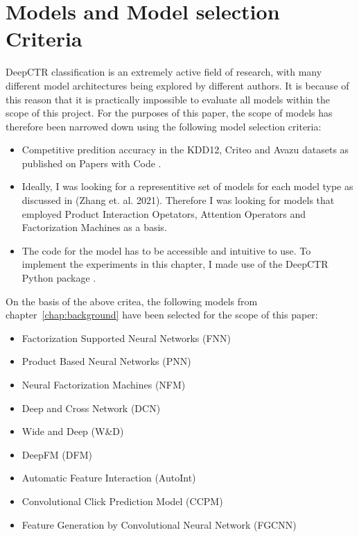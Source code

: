 \documentclass{mldsmsc}
\begin{document}
\section{Models and Model selection Criteria}
\label{sec:model-selection}

DeepCTR classification is an extremely active field of research, with many
different model architectures being explored by different authors. It is because of this
reason that it is practically impossible to evaluate all models within the scope
of this project. For the purposes of this paper, the scope of models has therefore
been narrowed down using the following model selection criteria:

\begin{itemize}
\item Competitive predition accuracy in the KDD12, Criteo and Avazu datasets as published on Papers with Code \citep{RefWorks:2024papers}.
\item Ideally, I was looking for a representitive set of models for each model type as discussed in (Zhang et. al. 2021). Therefore I was looking for models that employed Product Interaction Opetators, Attention Operators and Factorization Machines as a basis.
\item The code for the model has to be accessible and intuitive to use. To implement the experiments
in this chapter, I made use of the DeepCTR Python package \citep{RefWorks:shen2017deepctr:}.
\end{itemize}

On the basis of the above critea, the following models from chapter~\ref{chap:background} have been selected for the scope of this paper:

\begin{itemize}
\item Factorization Supported Neural Networks (FNN) \citep{RefWorks:zhang2016deep}
\item Product Based Neural Networks (PNN) \citep{RefWorks:qu2016product-based}
\item Neural Factorization Machines (NFM) \citep{RefWorks:he2017neural}
\item Deep and Cross Network (DCN) \citep{RefWorks:wang2017deep}
\item Wide and Deep (W\&D) \citep{RefWorks:cheng2016wide}
\item DeepFM (DFM) \citep{RefWorks:guo2017deepfm:}
\item Automatic Feature Interaction (AutoInt) \citep{RefWorks:song2019autoint}
\item Convolutional Click Prediction Model (CCPM) \citep{RefWorks:liu2015convolutional}
\item Feature Generation by Convolutional Neural Network (FGCNN) \citep{RefWorks:liu2019feature}
\end{itemize}
\end{document}
